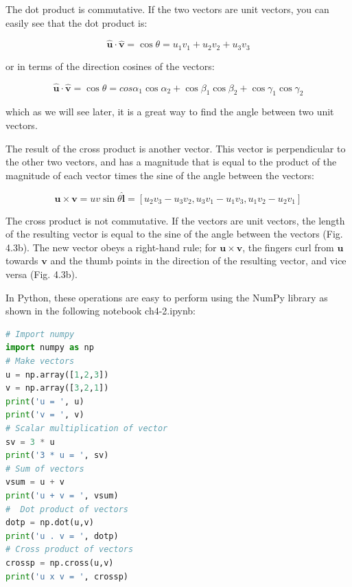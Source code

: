 \documentclass[a4paper , 12pt]{book}
\begin{document}
The dot product is commutative. If the two vectors are unit vectors, you can easily see that the dot product is:

\begin{equation}
    \mathbf{\hat u} \cdot\mathbf{\hat v}=\cos\theta=u_1v_1+u_2v_2+u_3v_3
\end{equation}

or in terms of the direction cosines of the vectors:

\begin{equation}
    \mathbf{\hat u} \cdot\mathbf{\hat v}=\cos\theta=cos\alpha_1\cos\alpha_2+\cos\beta_1\cos\beta_2+\cos\gamma_1\cos\gamma_2
\end{equation}

which as we will see later, it is a great way to find the angle between two unit vectors.

The result of the cross product is another vector. This vector is perpendicular to the other two vectors, and has a magnitude that is equal to the product of the magnitude of each vector times the sine of the angle between the vectors:

\begin{equation}
    \mathbf u\times\mathbf v=uv\sin\theta\mathbf{\hat l}=[u_2v_3-u_3v_2,u_3v_1-u_1v_3,u_1v_2-u_2v_1]
\end{equation}

The cross product is not commutative. If the vectors are unit vectors, the length of the resulting vector is equal to the sine of the angle between the vectors (Fig. 4.3b). The new vector obeys a right-hand rule; for $\mathbf u\times\mathbf v$, the fingers curl from $\mathbf u$ towards $\mathbf v$ and the thumb points in the direction of the resulting vector, and vice versa (Fig. 4.3b).

In Python, these operations are easy to perform using the NumPy library as shown in the following notebook ch4-2.ipynb:

\begin{center}
\begin{lstlisting}[language=Python, frame=single]
# Import numpy
import numpy as np
# Make vectors
u = np.array([1,2,3])
v = np.array([3,2,1])
print('u = ', u)
print('v = ', v)
# Scalar multiplication of vector
sv = 3 * u
print('3 * u = ', sv)
# Sum of vectors
vsum = u + v
print('u + v = ', vsum)
#  Dot product of vectors
dotp = np.dot(u,v)
print('u . v = ', dotp)
# Cross product of vectors
crossp = np.cross(u,v) 
print('u x v = ', crossp)
\end{lstlisting}
\end{center}
\end{document}
